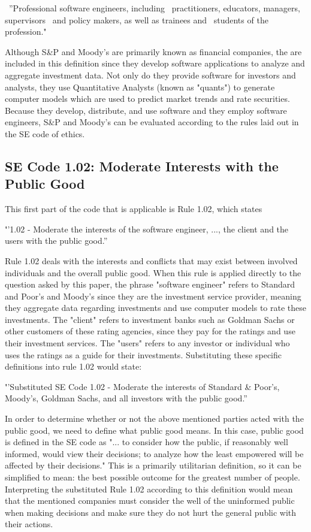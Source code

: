 \documentclass[11pt]{article}
\begin{document}
\begin{multicols}{2}
\ ''Professional software engineers, including
\ practitioners, educators, managers, supervisors
\ and policy makers, as well as trainees and
\ students of the profession."

Although S\&P and Moody's are primarily known as financial companies, the are included in this definition since they develop software applications to analyze and aggregate investment data. \cite{SnP, Moodys} Not only do they provide software for investors and analysts, they use Quantitative Analysts (known as "quants") to generate computer models which are used to predict market trends and rate securities. \cite{quantsRole, govtReport}  Because they develop, distribute, and use software and they employ software engineers, S\&P and Moody's can be evaluated according to the rules laid out in the SE code of ethics. 

\subsection{SE Code 1.02: Moderate Interests with the Public Good}
This first part of the code that is applicable is Rule 1.02, which states
 

{\textbf''1.02 - Moderate the interests of the software engineer, ..., the client and the users with the public good.''}


Rule 1.02 deals with the interests and conflicts that may exist between involved individuals and the overall public good.  When this rule is applied directly to the question asked by this paper, the phrase "software engineer" refers to Standard and Poor's and Moody's since they are the investment service provider, meaning they aggregate data regarding investments and use computer models to rate these investments. The "client" refers to investment banks such as Goldman Sachs or other customers of these rating agencies, since they pay for the ratings and use their investment services.  The "users" refers to any investor or individual who uses the ratings as a guide for their investments.  Substituting these specific definitions into rule 1.02 would state:


{\textbf''Substituted SE Code 1.02 - Moderate the interests of Standard \& Poor's, Moody's, Goldman Sachs, and all investors with the public good.''}


In order to determine whether or not the above mentioned parties acted with the public good, we need to define what public good means.  In this case, public good is defined in the SE code as "... to consider how the public, if reasonably well informed, would view their decisions; to analyze how the least empowered will be affected by their decisions." \cite{SECode}  This is a primarily utilitarian definition, so it can be simplified to mean: the best possible outcome for the greatest number of people.  Interpreting the substituted Rule 1.02 according to this definition would mean that the mentioned companies must consider the well of the uninformed public when making decisions and make sure they do not hurt the general public with their actions.
  

\end{multicols}
\end{document}
